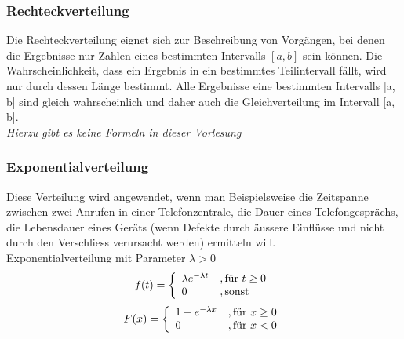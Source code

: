 \subsubsection{Rechteckverteilung}
Die Rechteckverteilung eignet sich zur Beschreibung von Vorgängen, bei denen die Ergebnisse nur Zahlen eines bestimmten Intervalls $[a, b]$ sein können. Die Wahrscheinlichkeit, dass ein Ergebnis in ein bestimmtes Teilintervall fällt, wird nur durch dessen Länge bestimmt. Alle Ergebnisse eine bestimmten Intervalls [a, b] sind gleich wahrscheinlich und daher auch die Gleichverteilung im Intervall [a, b].\\
\textit{Hierzu gibt es keine Formeln in dieser Vorlesung}
\subsubsection{Exponentialverteilung}
Diese Verteilung wird angewendet, wenn man Beispielsweise die Zeitspanne zwischen zwei Anrufen in einer Telefonzentrale, die Dauer eines Telefongesprächs, die Lebensdauer eines Geräts (wenn Defekte durch äussere Einflüsse und nicht durch den Verschliess verursacht werden) ermitteln will.\\
Exponentialverteilung mit Parameter $\lambda > 0$
\begin{equation}
f(t) = \left\{\begin{array}{l l} \lambda e^{-\lambda t}&, \mbox{für }t\geq 0\\ 0 &, \mbox{sonst}\end{array}\right.
\end{equation}
\begin{equation}
F(x) = \left\{\begin{array}{l l} 1-e^{-\lambda x}&,\mbox{für $x\geq 0$}\\ 0 &,\mbox{für }x < 0\end{array}\right.
\end{equation}

